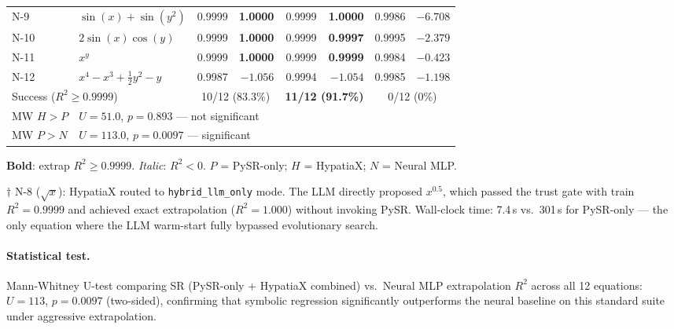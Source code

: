 \documentclass[twoside,11pt]{article}
\newcommand{\Rsq}{R^{2}}
\begin{document}
\begin{table}[h]
\begin{threeparttable}
\begin{tabular}{llrrrrrr}
N-9  & $\sin(x)+\sin(y^2)$
  & 0.9999 & \textbf{1.0000}
  & 0.9999 & \textbf{1.0000}
  & 0.9986 & $-6.708$ \\
N-10 & $2\sin(x)\cos(y)$
  & 0.9999 & \textbf{1.0000}
  & 0.9999 & \textbf{0.9997}
  & 0.9995 & $-2.379$ \\
N-11 & $x^y$
  & 0.9999 & \textbf{1.0000}
  & 0.9999 & \textbf{0.9999}
  & 0.9984 & $-0.423$ \\
N-12 & $x^4 - x^3 + \tfrac{1}{2}y^2 - y$
  & 0.9987 & $-1.056$
  & 0.9994 & $-1.054$
  & 0.9985 & $-1.198$ \\
\midrule
\multicolumn{2}{l}{Success ($\Rsq\ge0.9999$)}
  & \multicolumn{2}{c}{10/12 (83.3\%)}
  & \multicolumn{2}{c}{\textbf{11/12 (91.7\%)}}
  & \multicolumn{2}{c}{0/12 (0\%)} \\
MW $H>P$   & \multicolumn{7}{l}{$U=51.0$, $p=0.893$ — not significant} \\
MW $P>N$   & \multicolumn{7}{l}{$U=113.0$, $p=0.0097$ — significant} \\
\bottomrule
\end{tabular}
\begin{tablenotes}\small
  \item \textbf{Bold}: extrap $\Rsq \ge 0.9999$. \emph{Italic}: $\Rsq < 0$.
    $P$ = PySR-only; $H$ = HypatiaX; $N$ = Neural MLP.
  \item[$\dag$] N-8 ($\sqrt{x}$): HypatiaX routed to \texttt{hybrid\_llm\_only} mode.
    The LLM directly proposed $x^{0.5}$, which passed the trust gate with
    train $\Rsq = 0.9999$ and achieved exact extrapolation ($\Rsq = 1.000$)
    without invoking PySR. Wall-clock time: 7.4\,s vs.\ 301\,s for PySR-only ---
    the only equation where the LLM warm-start fully bypassed evolutionary search.
\end{tablenotes}
\end{threeparttable}
\end{table}

\paragraph{Statistical test.}
Mann-Whitney U-test comparing SR (PySR-only + HypatiaX combined) vs.\ Neural MLP
extrapolation $\Rsq$ across all 12 equations: $U=113$, $p=0.0097$ (two-sided),
confirming that symbolic regression significantly outperforms the neural baseline
on this standard suite under aggressive extrapolation.
\end{document}
